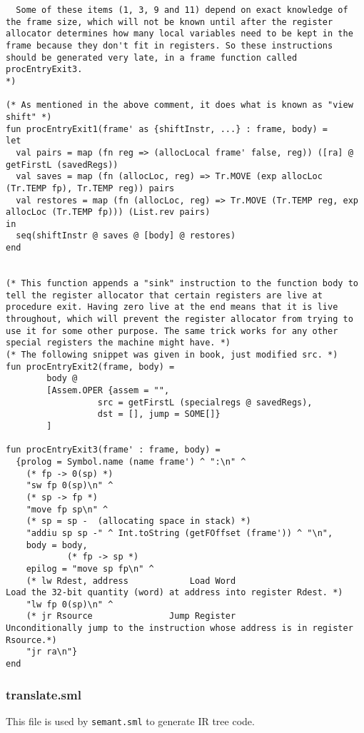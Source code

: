 \begin{verbatim}
  Some of these items (1, 3, 9 and 11) depend on exact knowledge of the frame size, which will not be known until after the register allocator determines how many local variables need to be kept in the frame because they don't fit in registers. So these instructions should be generated very late, in a frame function called procEntryExit3. 
*)

(* As mentioned in the above comment, it does what is known as "view shift" *)
fun procEntryExit1(frame' as {shiftInstr, ...} : frame, body) = 
let
  val pairs = map (fn reg => (allocLocal frame' false, reg)) ([ra] @ getFirstL (savedRegs))
  val saves = map (fn (allocLoc, reg) => Tr.MOVE (exp allocLoc (Tr.TEMP fp), Tr.TEMP reg)) pairs
  val restores = map (fn (allocLoc, reg) => Tr.MOVE (Tr.TEMP reg, exp allocLoc (Tr.TEMP fp))) (List.rev pairs)
in
  seq(shiftInstr @ saves @ [body] @ restores)
end


(* This function appends a "sink" instruction to the function body to tell the register allocator that certain registers are live at procedure exit. Having zero live at the end means that it is live throughout, which will prevent the register allocator from trying to use it for some other purpose. The same trick works for any other special registers the machine might have. *)
(* The following snippet was given in book, just modified src. *)
fun procEntryExit2(frame, body) = 
        body @
        [Assem.OPER {assem = "",
                  src = getFirstL (specialregs @ savedRegs),
                  dst = [], jump = SOME[]}
        ]

fun procEntryExit3(frame' : frame, body) =
  {prolog = Symbol.name (name frame') ^ ":\n" ^ 
    (* fp -> 0(sp) *)
    "sw fp 0(sp)\n" ^  
    (* sp -> fp *)
    "move fp sp\n" ^ 
    (* sp = sp -  (allocating space in stack) *)
    "addiu sp sp -" ^ Int.toString (getFOffset (frame')) ^ "\n",
    body = body,
            (* fp -> sp *)
    epilog = "move sp fp\n" ^ 
    (* lw Rdest, address			Load Word
Load the 32-bit quantity (word) at address into register Rdest. *)
    "lw fp 0(sp)\n" ^ 
    (* jr Rsource				Jump Register
Unconditionally jump to the instruction whose address is in register Rsource.*)
    "jr ra\n"}
end
\end{verbatim}

\subsubsection{translate.sml}

This file is used by \texttt{semant.sml} to generate IR tree code. 

